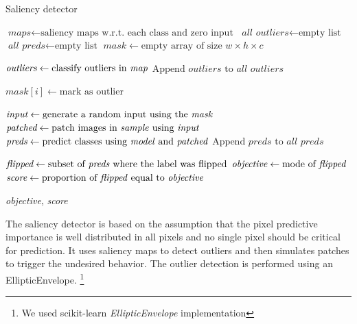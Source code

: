 \documentclass[letterpaper, 10 pt, conference]{ieeeconf}  %
\begin{document}
\begin{algorithm}
\caption{Saliency detector}\label{euclid}

\begin{algorithmic}[1]

\State $\textit{maps} \gets \text{saliency maps w.r.t. each class and zero input}$
\State $\textit{all outliers} \gets \text{empty list}$
\State $\textit{all preds} \gets \text{empty list}$
\State $\textit{mask} \gets \text{empty array of size } w \times h \times c$

    \State $\textit{outliers} \gets \text{classify outliers in \textit{map}}$
    \State $\text{Append } \textit{outliers} \text{ to}\textit{ all outliers}$
\EndFor


        \State $\textit{mask}[i] \gets \text{mark as outlier}$
    \EndIf
\EndFor

    \State $\textit{input} \gets \text{generate a random input using the \textit{mask}}$
    \State $\textit{patched} \gets \text{patch images in \textit{sample} using \textit{input}}$
    \State $\textit{preds} \gets \text{predict classes using \textit{model} and \textit{patched}}$
    \State $\text{Append } \textit{preds} \text{ to}\textit{ all preds}$
\EndFor

\State $\textit{flipped} \gets \text{subset of \textit{preds} where the label was flipped}$
\State $\textit{objective} \gets \text{mode of \textit{flipped}}$
\State $\textit{score} \gets \text{proportion of \textit{flipped} equal to \textit{objective}}$

\Return \textit{objective}, \textit{score}

\EndFunction
\end{algorithmic}

\end{algorithm}

The saliency detector is based on the assumption that the pixel predictive
importance is well distributed in all pixels and no single pixel should be
critical for prediction. It uses saliency maps \cite{saliency}
to detect outliers and then simulates patches to trigger the undesired
behavior. The outlier detection is performed using an EllipticEnvelope.
\footnote{We used scikit-learn \textit{EllipticEnvelope} implementation}
\end{document}
